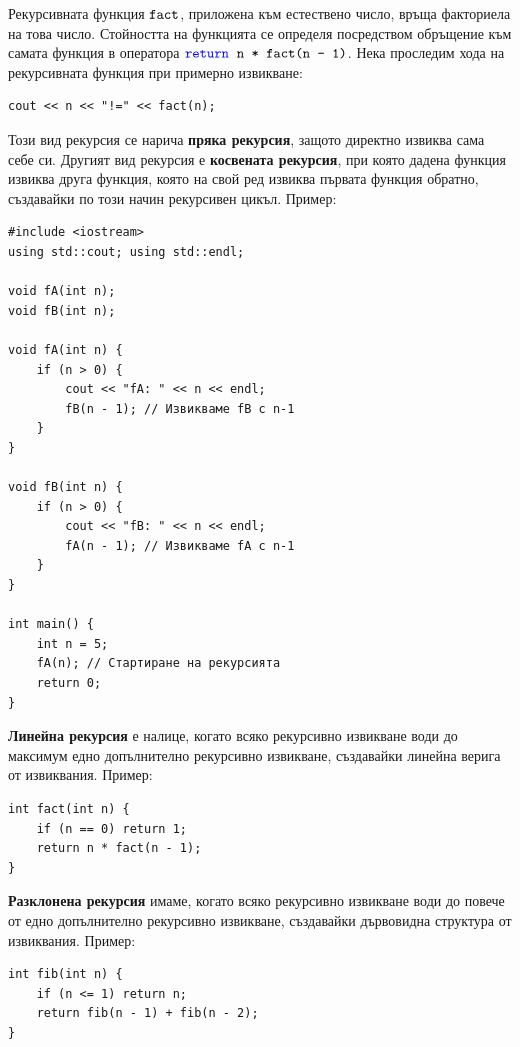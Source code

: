 \documentclass{article}
\begin{document}
Рекурсивната функция $\textcolor{black}{\texttt{fact}}$, приложена към естествено число, връща факториела на това число. Стойността на функцията се определя
посредством обръщение към самата функция в оператора $\textcolor{blue}{\texttt{return}} \hspace{0.2cm} \textcolor{black}{\texttt{n * fact(n - 1)}}$. Нека проследим хода на рекурсивната функция при
примерно извикване:
\begin{lstlisting}[style=cpp]
cout << n << "!=" << fact(n);
\end{lstlisting}
Този вид рекурсия се нарича \textbf{пряка рекурсия}, защото директно извиква сама себе си. Другият вид рекурсия е \textbf{косвената рекурсия},
при която дадена функция извиква друга функция, която на свой ред извиква първата функция обратно, създавайки по този начин рекурсивен цикъл. \newline\newline
Пример:
\begin{lstlisting}[style=cpp]
#include <iostream>
using std::cout; using std::endl;

void fA(int n);
void fB(int n);

void fA(int n) {
    if (n > 0) {
        cout << "fA: " << n << endl;
        fB(n - 1); // Извикваме fB с n-1
    }
}

void fB(int n) {
    if (n > 0) {
        cout << "fB: " << n << endl;
        fA(n - 1); // Извикваме fA с n-1
    }
}

int main() {
    int n = 5;
    fA(n); // Стартиране на рекурсията
    return 0;
}
\end{lstlisting}
\textbf{Линейна рекурсия} е налице, когато всяко рекурсивно извикване води до максимум едно допълнително рекурсивно извикване, създавайки
линейна верига от извиквания. \newline\newline
Пример:
\begin{lstlisting}[style=cpp]
int fact(int n) {
    if (n == 0) return 1;
    return n * fact(n - 1);
}
\end{lstlisting}
\textbf{Разклонена рекурсия} имаме, когато всяко рекурсивно извикване води до повече от едно допълнително рекурсивно извикване, създавайки
дървовидна структура от извиквания. \newline\newline
Пример:
\begin{lstlisting}[style=cpp]
int fib(int n) { 
    if (n <= 1) return n;
    return fib(n - 1) + fib(n - 2);
} 
\end{lstlisting}
\end{document}
